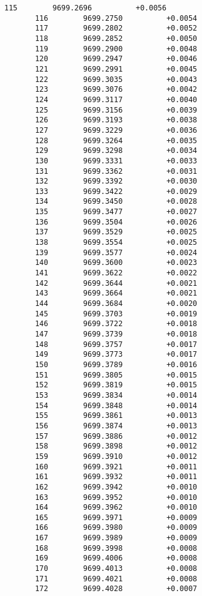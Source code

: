 \documentclass[11pt]{article}
\begin{document}
\begin{Verbatim}[commandchars=\\\{\}]
       115        9699.2696          +0.0056
       116        9699.2750          +0.0054
       117        9699.2802          +0.0052
       118        9699.2852          +0.0050
       119        9699.2900          +0.0048
       120        9699.2947          +0.0046
       121        9699.2991          +0.0045
       122        9699.3035          +0.0043
       123        9699.3076          +0.0042
       124        9699.3117          +0.0040
       125        9699.3156          +0.0039
       126        9699.3193          +0.0038
       127        9699.3229          +0.0036
       128        9699.3264          +0.0035
       129        9699.3298          +0.0034
       130        9699.3331          +0.0033
       131        9699.3362          +0.0031
       132        9699.3392          +0.0030
       133        9699.3422          +0.0029
       134        9699.3450          +0.0028
       135        9699.3477          +0.0027
       136        9699.3504          +0.0026
       137        9699.3529          +0.0025
       138        9699.3554          +0.0025
       139        9699.3577          +0.0024
       140        9699.3600          +0.0023
       141        9699.3622          +0.0022
       142        9699.3644          +0.0021
       143        9699.3664          +0.0021
       144        9699.3684          +0.0020
       145        9699.3703          +0.0019
       146        9699.3722          +0.0018
       147        9699.3739          +0.0018
       148        9699.3757          +0.0017
       149        9699.3773          +0.0017
       150        9699.3789          +0.0016
       151        9699.3805          +0.0015
       152        9699.3819          +0.0015
       153        9699.3834          +0.0014
       154        9699.3848          +0.0014
       155        9699.3861          +0.0013
       156        9699.3874          +0.0013
       157        9699.3886          +0.0012
       158        9699.3898          +0.0012
       159        9699.3910          +0.0012
       160        9699.3921          +0.0011
       161        9699.3932          +0.0011
       162        9699.3942          +0.0010
       163        9699.3952          +0.0010
       164        9699.3962          +0.0010
       165        9699.3971          +0.0009
       166        9699.3980          +0.0009
       167        9699.3989          +0.0009
       168        9699.3998          +0.0008
       169        9699.4006          +0.0008
       170        9699.4013          +0.0008
       171        9699.4021          +0.0008
       172        9699.4028          +0.0007

\end{Verbatim}
\end{document}
